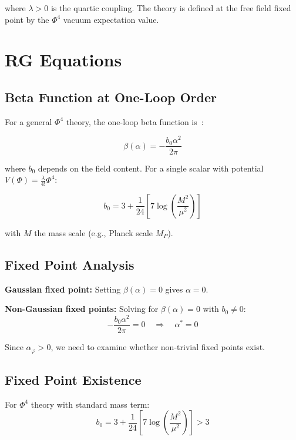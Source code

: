 \documentclass{article}
\begin{document}
where $\lambda > 0$ is the quartic coupling. The theory is defined at the free field fixed point by the $\Phi^4$ vacuum expectation value.

\section{RG Equations}

\subsection{Beta Function at One-Loop Order}

For a general $\Phi^4$ theory, the one-loop beta function is~\cite{WilsonFisher1974}:

\begin{equation}
  \beta(\alpha) = -\frac{b_0 \alpha^2}{2\pi}
  \label{eq:beta-1loop}
\end{equation}

where $b_0$ depends on the field content. For a single scalar with potential $V(\Phi) = \frac{\lambda}{4!}\Phi^4$:

\begin{equation}
  b_0 = 3 + \frac{1}{24}\left[7\log\left(\frac{M^2}{\mu^2}\right)\right]
  \label{eq:beta0-phi4}
\end{equation}

with $M$ the mass scale (e.g., Planck scale $M_P$).

\subsection{Fixed Point Analysis}

\textbf{Gaussian fixed point:} Setting $\beta(\alpha) = 0$ gives $\alpha = 0$.

\textbf{Non-Gaussian fixed points:} Solving for $\beta(\alpha) = 0$ with $b_0 \neq 0$:
\begin{equation}
  -\frac{b_0 \alpha^2}{2\pi} = 0 \quad \Rightarrow \quad \alpha^* = 0
  \label{eq:fixed-point}
\end{equation}

Since $\alpha_\varphi > 0$, we need to examine whether non-trivial fixed points exist.

\subsection{Fixed Point Existence}

For $\Phi^4$ theory with standard mass term:
\begin{equation}
  b_0 = 3 + \frac{1}{24}\left[7\log\left(\frac{M^2}{\mu^2}\right)\right] > 3
\end{equation}
\end{document}
